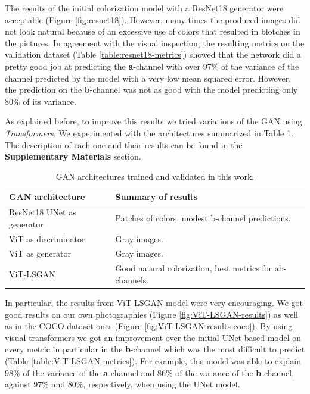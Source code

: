 \documentclass[
]{article}
\begin{document}
The results of the initial colorization model with a ResNet18 generator
were acceptable (Figure \ref{fig:resnet18}). However, many times the produced images did not look
natural because of an excessive use of colors that resulted in blotches
in the pictures. In agreement with the visual inspection, the resulting
metrics on the validation dataset (Table \ref{table:resnet18-metrics}) showed that the network did a pretty
good job at predicting the \textbf{a}-channel with over 97\% of the
variance of the channel predicted by the model with a very low mean
squared error. However, the prediction on the \textbf{b}-channel was not
as good with the model predicting only 80\% of its variance.

As explained before, to improve this results we tried variations of the
GAN using \emph{Transformers}. We experimented with the architectures summarized in Table \ref{table:architectures}. The description of each one and their results can be
found in the \textbf{Supplementary Materials} section.

\begin{table}\centering\caption[GAN architectures trained and validated in this work.]{GAN architectures trained and validated in this work.}\label{table:architectures}\begin{tabular}{ll}
\toprule{}                 GAN architecture & Summary of results\\
\midrule    
ResNet18 UNet as generator & Patches of colors, modest b-channel predictions.\\
ViT as discriminator       & Gray images.    \\
ViT as generator           & Gray images.    \\
ViT-LSGAN                  & Good natural colorization, best metrics for ab-channels.  \\
\bottomrule\end{tabular}\end{table}

In particular, the results from ViT-LSGAN model were very encouraging.  We got good results on our own photographies (Figure \ref{fig:ViT-LSGAN-results}) as well as in the COCO dataset ones (Figure \ref{fig:ViT-LSGAN-results-coco}). By using visual
transformers we got an improvement over the initial UNet based model on
every metric in particular in the \textbf{b}-channel which was the most
difficult to predict (Table \ref{table:ViT-LSGAN-metrics}). For example, this model was able to explain 98\%
of the variance of the \textbf{a}-channel and 86\% of the variance of
the \textbf{b}-channel, against 97\% and 80\%, respectively, when using
the UNet model.
\end{document}
